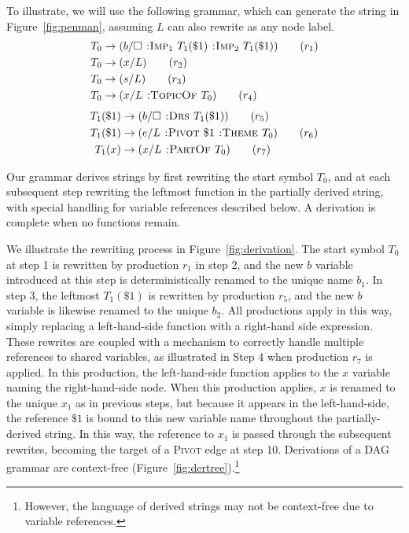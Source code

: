 \documentclass[11pt,a4paper]{article}
\theoremstyle{plain}
\begin{document}
To illustrate, we will use the following grammar, which can generate the string in Figure~\ref{fig:penman}, assuming $L$ can also rewrite as any node label.\begin{align*}
    T_0 &\rightarrow (b/\square \textsc{~:Imp}_1~T_1(\$1) \textsc{~:Imp}_2~T_1(\$1)) \tag{$r_1$}\\
    T_0 &\rightarrow (x/L) \tag{$r_2$}\\
    T_0 &\rightarrow (s/L) \tag{$r_3$}\\
    T_0 &\rightarrow (x/L \textsc{~:TopicOf~} T_0) \tag{$r_4$}
\end{align*}\vspace{-9mm}
\begin{align*}
    T_1(\$1) &\rightarrow (b/\square \textsc{~:Drs~} T_1(\$1)) \tag{$r_5$}\\
    T_1(\$1) &\rightarrow (e/L \textsc{~:Pivot~} \$1 \textsc{~:Theme~} T_0) \tag{$r_6$}\\
    T_1(x) &\rightarrow (x/L \textsc{~:PartOf~} T_0) \tag{$r_7$}
\end{align*}

Our grammar derives strings by first rewriting the start symbol $T_0$, and at each subsequent step rewriting the leftmost function in the partially derived string, with special handling for variable references described below. A derivation is complete when no functions remain. 

We illustrate the rewriting process in Figure~\ref{fig:derivation}. The start symbol $T_0$ at step 1 is rewritten by production $r_1$ in step 2, and the new $b$ variable introduced at this step is deterministically renamed to the unique name $b_1$. In step 3, the leftmost $T_1(\$1)$ is rewritten by production $r_5$, and the new $b$ variable is likewise renamed to the unique $b_2$. All productions apply in this way, simply replacing a left-hand-side function with a right-hand side expression. These rewrites are
coupled with a mechanism to correctly handle multiple references to shared variables, as illustrated in Step 4 when production $r_7$ is applied. In this production, the left-hand-side function applies to the $x$ variable naming the right-hand-side node. When this production applies, $x$ is renamed to the unique $x_1$ as in previous steps, but because it appears in the left-hand-side, the reference $\$1$ is bound to this new variable name throughout the partially-derived string. In this way, the reference to $x_1$ is passed through the subsequent rewrites, becoming the target of a \textsc{Pivot} edge at step 10.
Derivations of a DAG grammar are context-free (Figure~\ref{fig:dertree}).\footnote{However, the language of derived strings may not be context-free due to variable references.}
\end{document}
